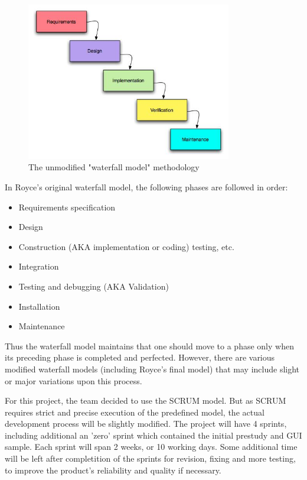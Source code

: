 \begin{figure}[htb]
	\centering
	\includegraphics[width=0.8\textwidth]{process/development_process/waterfall.jpg}
	\caption{The unmodified "waterfall model" methodology\cite{worldpress:waterfall}}
	\label{fig:waterfall-model}
\end{figure}

In Royce's original waterfall model, the following phases are followed in order:

\begin{itemize}
	\item Requirements specification
	\item Design
	\item Construction (AKA implementation or coding) testing, etc.
	\item Integration
	\item Testing and debugging (AKA Validation)
	\item Installation
	\item Maintenance
\end{itemize}

Thus the waterfall model maintains that one should move to a phase only when its preceding phase is 
completed and perfected. However, there are various modified waterfall models (including Royce's final model) 
that may include slight or major variations upon this process.\newline\newline
	
For this project, the team decided to use the SCRUM model. But as SCRUM requires strict and precise
execution of the predefined model, the actual development process will be slightly modified. 
The project will have 4 sprints, including additional an 'zero' sprint which contained the initial
prestudy and GUI sample. Each sprint will span 2 weeks, or 10 working days. 
Some additional time will be left after completition of the sprints for revision, 
fixing and more testing, to improve the product's reliability and quality if necessary.
